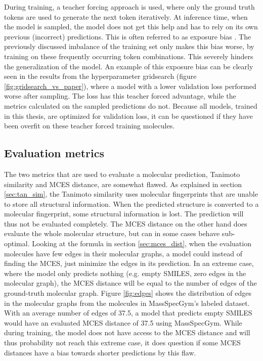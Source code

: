 During training, a teacher forcing approach is used, where only the ground truth tokens are used to generate the next token iteratively.
At inference time, when the model is sampled, the model does not get this help and has to rely on its own previous (incorrect) predictions.
This is often referred to as exposure bias \cite{schmidt2019generalization}.
The previously discussed imbalance of the training set only makes this bias worse, by training on these frequently occurring token combinations.
This severely hinders the generalization of the model.
An example of this exposure bias can be clearly seen in the results from the hyperparameter gridsearch (figure \ref{fig:gridsearch_vs_paper}), where a model with a lower validation loss performed worse after sampling.
The loss has this teacher forced advantage, while the metrics calculated on the sampled predictions do not.
Because all models, trained in this thesis, are optimized for validation loss, it can be questioned if they have been overfit on these teacher forced training molecules.

\subsection{Evaluation metrics}
The two metrics that are used to evaluate a molecular prediction, Tanimoto similarity and \ac{MCES} distance, are somewhat flawed.
As explained in section \ref{sec:tan_sim}, the Tanimoto similarity uses molecular fingerprints that are unable to store all structural information.
When the predicted structure is converted to a molecular fingerprint, some structural information is lost.
The prediction will thus not be evaluated completely.
The \ac{MCES} distance on the other hand does evaluate the whole molecular structure, but can in some cases behave sub-optimal.
Looking at the formula in section \ref{sec:mces_dist}, when the evaluation molecules have few edges in their molecular graphs, a model could instead of finding the \acf{MCES}, just minimize the edges in its prediction.
In an extreme case, where the model only predicts nothing (e.g. empty SMILES, zero edges in the molecular graph), the MCES distance will be equal to the number of edges of the ground-truth molecular graph.
Figure \ref{fig:edges} shows the distribution of edges in the molecular graphs from the molecules in MassSpecGym's labeled dataset.
With an average number of edges of 37.5, a model that predicts empty SMILES would have an evaluated MCES distance of 37.5 using MassSpecGym.
While during training, the model does not have access to the MCES distance and will thus probability not reach this extreme case, it does question if some \ac{MCES} distances have a bias towards shorter predictions by this flaw.

